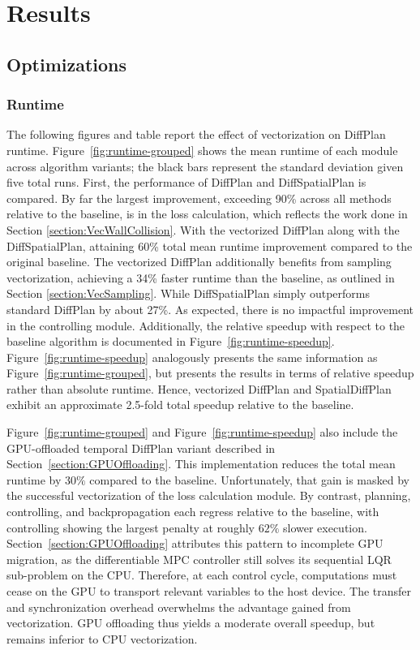 \chapter{Results}
\label{chapter:Results}

\section{Optimizations}
\label{section:Optimizations}

\subsection{Runtime}

The following figures and table report the effect of vectorization on DiffPlan runtime.
Figure~\ref{fig:runtime-grouped} shows the mean runtime of each module across algorithm variants; the black bars represent the standard deviation given five total runs.
First, the performance of DiffPlan and DiffSpatialPlan is compared.
By far the largest improvement, exceeding 90\% across all methods relative to the baseline, is in the loss calculation, which reflects the work done in Section \ref{section:VecWallCollision}.
With the vectorized DiffPlan along with the DiffSpatialPlan, attaining 60\% total mean runtime improvement compared to the original baseline.
The vectorized DiffPlan additionally benefits from sampling vectorization, achieving a 34\% faster runtime than the baseline, as outlined in Section \ref{section:VecSampling}.
While DiffSpatialPlan simply outperforms standard DiffPlan by about 27\%.
As expected, there is no impactful improvement in the controlling module.
Additionally, the relative speedup with respect to the baseline algorithm is documented in Figure~\ref{fig:runtime-speedup}.
Figure~\ref{fig:runtime-speedup} analogously presents the same information as Figure~\ref{fig:runtime-grouped}, but presents the results in terms of relative speedup rather than absolute runtime.
Hence, vectorized DiffPlan and SpatialDiffPlan exhibit an approximate 2.5-fold total speedup relative to the baseline.

Figure~\ref{fig:runtime-grouped} and Figure~\ref{fig:runtime-speedup} also include the GPU-offloaded temporal DiffPlan variant described in Section~\ref{section:GPUOffloading}.
This implementation reduces the total mean runtime by $30\%$ compared to the baseline.
Unfortunately, that gain is masked by the successful vectorization of the loss calculation module.
By contrast, planning, controlling, and backpropagation each regress relative to the baseline, with controlling showing the largest penalty at roughly $62\%$ slower execution.
Section~\ref{section:GPUOffloading} attributes this pattern to incomplete GPU migration, as the differentiable MPC controller still solves its sequential LQR sub-problem on the CPU.
Therefore, at each control cycle, computations must cease on the GPU to transport relevant variables to the host device. 
The transfer and synchronization overhead overwhelms the advantage gained from vectorization.
GPU offloading thus yields a moderate overall speedup, but remains inferior to CPU vectorization.


